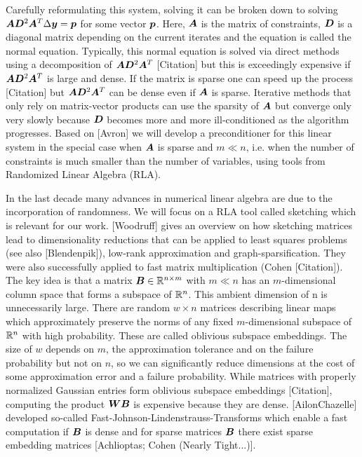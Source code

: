 Carefully reformulating this system, solving it can be broken down to solving \(\bm{A} \bm{D}^2 \bm{A}^T \Delta \bm{y} = \bm{p}\) for some vector \(\bm{p}\).
Here, \(\bm{A}\) is the matrix of constraints, \(\bm{D}\) is a diagonal matrix depending on the current iterates and the equation is called the normal equation.
Typically, this normal equation is solved via direct methods using a decomposition of \(\bm{A} \bm{D}^2 \bm{A}^T\) [Citation] but this is exceedingly expensive if \(\bm{A} \bm{D}^2 \bm{A}^T\) is large and dense.
If the matrix is sparse one can speed up the process [Citation] but \(\bm{A} \bm{D}^2 \bm{A}^T\) can be dense even if \(\bm{A}\) is sparse.
Iterative methods that only rely on matrix-vector products can use the sparsity of \(\bm{A}\) but converge only very slowly because \(\bm{D}\) becomes more and more ill-conditioned as the algorithm progresses.
Based on [Avron] we will develop a preconditioner for this linear system in the special case when \(\bm{A}\) is sparse and \(m \ll n\), i.e. when the number of constraints is much smaller than the number of variables, using tools from Randomized Linear Algebra (RLA).

In the last decade many advances in numerical linear algebra are due to the incorporation of randomness.
We will focus on a RLA tool called sketching which is relevant for our work.
[Woodruff] gives an overview on how sketching matrices lead to dimensionality reductions that can be applied to least squares problems (see also [Blendenpik]), low-rank approximation and graph-sparsification.
They were also successfully applied to fast matrix multiplication (Cohen [Citation]).
The key idea is that a matrix \(\bm{B} \in \mathbb{R}^{n \times m}\) with \(m \ll n\) has an \(m\)-dimensional column space that forms a subspace of \(\mathbb{R}^n\).
This ambient dimension of n is unnecessarily large.
There are random \(w \times n\) matrices describing linear maps which approximately preserve the norms of any fixed \(m\)-dimensional subspace of \(\mathbb{R}^n\) with high probability.
These are called oblivious subspace embeddings.
The size of \(w\) depends on \(m\), the approximation tolerance and on the failure probability but not on \(n\), so we can significantly reduce dimensions at the cost of some approximation error and a failure probability.
While matrices with properly normalized Gaussian entries form oblivious subspace embeddings [Citation], computing the product \(\bm{W}\bm{B}\) is expensive because they are dense.
[AilonChazelle] developed so-called Fast-Johnson-Lindenstrauss-Transforms which enable a fast computation if \(\bm{B}\) is dense and for sparse matrices \(\bm{B}\) there exist sparse embedding matrices [Achlioptas; Cohen (Nearly Tight...)].

